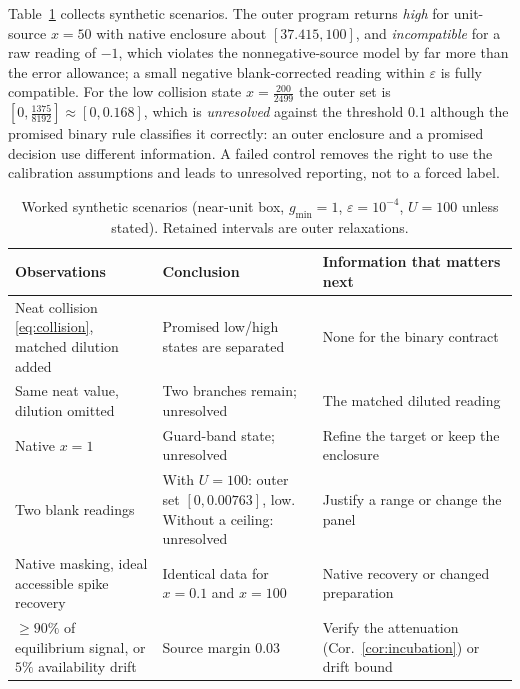 \documentclass[11pt]{article}
\theoremstyle{plain}
\theoremstyle{definition}
\numberwithin{equation}{section}
\newcommand{\eps}{\varepsilon}
\newcommand{\gmin}{g_{\min}}
\begin{document}
Table~\ref{tab:examples} collects synthetic scenarios. The outer program returns
\emph{high} for unit-source $x=50$ with native enclosure about $[37.415,100]$, and
\emph{incompatible} for a raw reading of $-1$, which violates the nonnegative-source
model by far more than the error allowance; a small negative blank-corrected reading
within $\eps$ is fully compatible. For the low collision state
$x=\frac{200}{2499}$ the outer set is $[0,\frac{1375}{8192}]\approx[0,0.168]$, which is
\emph{unresolved} against the threshold $0.1$ although the promised binary rule
classifies it correctly: an outer enclosure and a promised decision use different
information. A failed control removes the right to use the calibration assumptions
and leads to unresolved reporting, not to a forced label.

\begin{table}[t]
\centering\small
\caption{Worked synthetic scenarios (near-unit box, $\gmin=1$, $\eps=10^{-4}$,
$U=100$ unless stated). Retained intervals are outer relaxations.}
\label{tab:examples}
\begin{tabular}{@{}>{\raggedright\arraybackslash}p{.27\linewidth}>{\raggedright\arraybackslash}p{.33\linewidth}>{\raggedright\arraybackslash}p{.32\linewidth}@{}}\toprule
Observations & Conclusion & Information that matters next\\\midrule
Neat collision \eqref{eq:collision}, matched dilution added & Promised low/high states are separated & None for the binary contract\\
Same neat value, dilution omitted & Two branches remain; unresolved & The matched diluted reading\\
Native $x=1$ & Guard-band state; unresolved & Refine the target or keep the enclosure\\
Two blank readings & With $U=100$: outer set $[0,0.00763]$, low. Without a ceiling: unresolved & Justify a range or change the panel\\
Native masking, ideal accessible spike recovery & Identical data for $x=0.1$ and $x=100$ & Native recovery or changed preparation\\
$\ge90\%$ of equilibrium signal, or $5\%$ availability drift & Source margin $0.03$ & Verify the attenuation (Cor.~\ref{cor:incubation}) or drift bound\\\bottomrule
\end{tabular}
\end{table}
\end{document}

